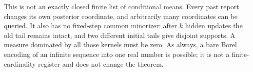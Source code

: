 This is not an exactly closed finite list of conditional means. Every
past report changes its own posterior coordinate, and arbitrarily many
coordinates can be queried. It also has no fixed-step common minorizer:
after $k$ hidden updates the old tail remains intact, and two different
initial tails give disjoint supports. A measure dominated by all those
kernels must be zero. As always, a bare Borel encoding of an infinite
sequence into one real number is possible; it is not a finite-cardinality
register and does not change the theorem.
